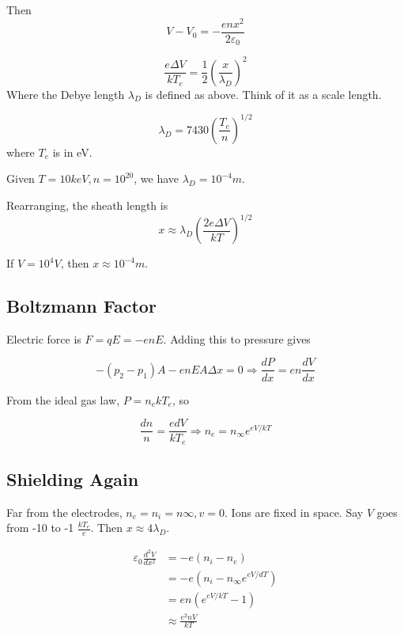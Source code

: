 \documentclass[12pt]{article}
\begin{document}
Then
$$V - V_0 = -\frac{enx^2}{2\varepsilon_0}$$

\begin{defn}
    $$\frac{e\Delta V}{kT_e} = \frac{1}{2}\left(\frac{x}{\lambda_D}\right)^2$$
    Where the Debye length $\lambda_D$ is defined as above. Think of it as a scale length.
\end{defn}

$$\lambda_D = 7430 \left(\frac{T_e}{n}\right)^{1/2}$$
where $T_e$ is in eV.

\begin{ex}
    Given $T = 10\unit{keV}, n = 10^{20}$, we have $\lambda_D = 10^{-4}\unit{m}$.
\end{ex}

Rearranging, the sheath length is
$$x \approx \lambda_D \left(\frac{2e\Delta V}{kT}\right)^{1/2}$$

\begin{ex}
    If $V = 10^4\unit{V}$, then $x \approx 10^{-4}\unit{m}$.
\end{ex}

\subsection{Boltzmann Factor}

Electric force is $F = qE = -enE$. Adding this to pressure gives

$$-(p_2 - p_1)A - enEA\Delta x = 0 \Rightarrow \frac{dP}{dx} = en \frac{dV}{dx}$$

From the ideal gas law, $P = n_ekT_e$, so

$$\frac{dn}{n} = \frac{edV}{kT_e} \Rightarrow n_e = n_\infty e^{eV/kT}$$

\subsection{Shielding Again}

Far from the electrodes, $n_e = n_i = n\infty, v = 0$. Ions are fixed in space. Say $V$ goes from -10 to -1 $\frac{kT_e}{e}$. Then $x \approx 4\lambda_D$.

\begin{align*}
    \varepsilon_0 \frac{d^2V}{dx^2} &= -e(n_i - n_e) \\
                                    &= -e\left(n_i - n_\infty e^{eV/dT}\right) \\
                                    &= en\left(e^{eV/kT} - 1\right) \\
                                    &\approx \frac{e^2nV}{kT}
\end{align*}
    
\end{document}
